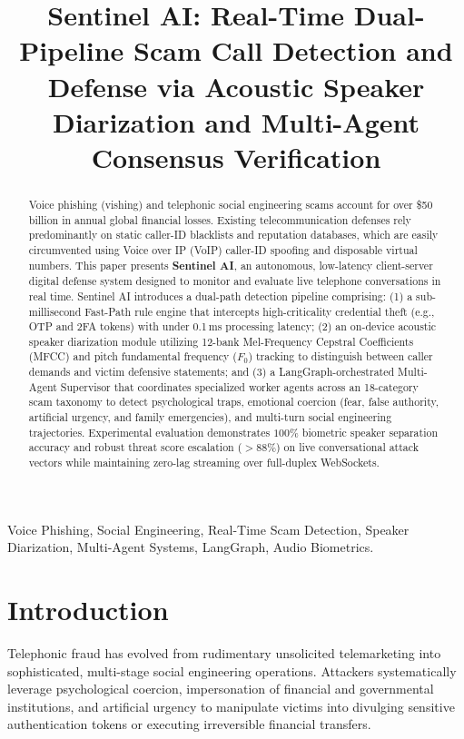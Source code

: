 \documentclass[conference]{IEEEtran}
\begin{document}
\title{Sentinel AI: Real-Time Dual-Pipeline Scam Call Detection and Defense via Acoustic Speaker Diarization and Multi-Agent Consensus Verification}

\author{
}

\maketitle

\begin{abstract}
Voice phishing (vishing) and telephonic social engineering scams account for over \$50 billion in annual global financial losses. Existing telecommunication defenses rely predominantly on static caller-ID blacklists and reputation databases, which are easily circumvented using Voice over IP (VoIP) caller-ID spoofing and disposable virtual numbers. This paper presents \textbf{Sentinel AI}, an autonomous, low-latency client-server digital defense system designed to monitor and evaluate live telephone conversations in real time. Sentinel AI introduces a dual-path detection pipeline comprising: (1) a sub-millisecond Fast-Path rule engine that intercepts high-criticality credential theft (e.g., OTP and 2FA tokens) with under 0.1\,ms processing latency; (2) an on-device acoustic speaker diarization module utilizing 12-bank Mel-Frequency Cepstral Coefficients (MFCC) and pitch fundamental frequency ($F_0$) tracking to distinguish between caller demands and victim defensive statements; and (3) a LangGraph-orchestrated Multi-Agent Supervisor that coordinates specialized worker agents across an 18-category scam taxonomy to detect psychological traps, emotional coercion (fear, false authority, artificial urgency, and family emergencies), and multi-turn social engineering trajectories. Experimental evaluation demonstrates $100\%$ biometric speaker separation accuracy and robust threat score escalation ($>88\%$) on live conversational attack vectors while maintaining zero-lag streaming over full-duplex WebSockets.
\end{abstract}

\begin{IEEEkeywords}
Voice Phishing, Social Engineering, Real-Time Scam Detection, Speaker Diarization, Multi-Agent Systems, LangGraph, Audio Biometrics.
\end{IEEEkeywords}

\section{Introduction}
Telephonic fraud has evolved from rudimentary unsolicited telemarketing into sophisticated, multi-stage social engineering operations. Attackers systematically leverage psychological coercion, impersonation of financial and governmental institutions, and artificial urgency to manipulate victims into divulging sensitive authentication tokens or executing irreversible financial transfers.
\end{document}
